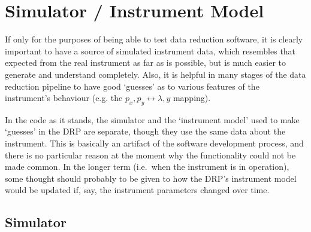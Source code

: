 \section{Simulator / Instrument Model}

If only for the purposes of being able to test data reduction software,
it is clearly important to have a source of simulated instrument data,
which resembles that expected from the real instrument as far as is
possible, but is much easier to generate and understand completely.
Also, it is helpful in many stages of the data reduction pipeline to
have good `guesses' as to various features of the instrument's behaviour
(e.g. the $p_x, p_y \leftrightarrow \lambda, y$ mapping).

In the code as it stands, the simulator and the `instrument model' used
to make `guesses' in the DRP are separate, though they use the same data
about the instrument. This is basically an artifact of the software
development process, and there is no particular reason at the moment why
the functionality could not be made common. In the longer term (i.e.\
when the instrument is in operation), some thought should probably to be
given to how the DRP's instrument model would be updated if, say, the
instrument parameters changed over time.

\subsection{Simulator}

